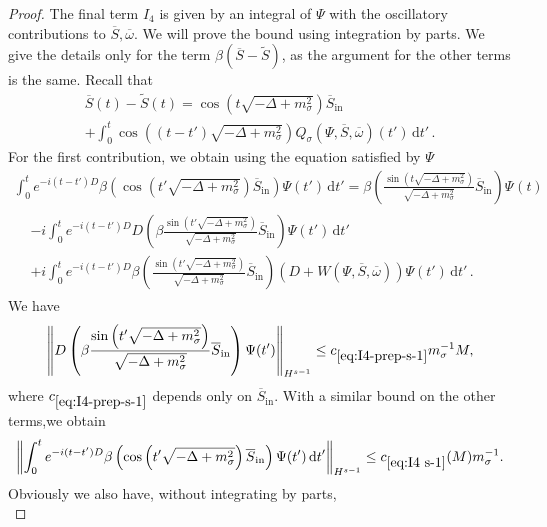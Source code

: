 \documentclass[10pt]{amsart}
\theoremstyle{definition}\newtheorem{defi}[theo]{Definition}\newtheorem{rema}[theo]{Remark}\newtheorem{exam}[theo]{Example}\newtheorem{exem}[theo]{Example}\newtheorem{nota}[theo]{Notation}
\newcommand{\rmin}{\mathrm{in}}
\renewcommand\d[1]{{\ensuremath{\,\text{d}#1}}}
\begin{document}
\begin{proof}
The final term $I_4$ is given by an integral of $\Psi$ with the oscillatory contributions to $\overline{S}, \overline{\omega}$. We will prove the bound using integration by parts. We give the details only for the term $\beta(\overline{S}-\widetilde{S})$, as the argument for the other terms is the same. Recall that
\begin{multline}
\overline{S}(t)-\widetilde{S}(t) =\cos\left(t\sqrt{-\Delta + m^2_\sigma}\right)\overline{S}_\rmin \\
+\int_0^t\cos\left((t-t')\sqrt{-\Delta + m^2_\sigma}\right) Q_\sigma(\Psi,\overline{S}, \overline{\omega})(t')\d t'\,.
\end{multline}
For the first contribution, we obtain using the equation satisfied by $\Psi$
\begin{multline*}
\int_0^t e^{-i(t-t')D}\beta \left(\cos(t'\sqrt{-\Delta + m^2_\sigma})\overline{S}_\rmin\right)\Psi(t') \d t'
=\beta\left(\frac{\sin\left(t\sqrt{-\Delta+m_\sigma^2}
\right)}{\sqrt{-\Delta+m_\sigma^2}}\overline{S}_\rmin\right)\Psi_{}(t)
\\
\begin{aligned}
&-i
\int_0^te^{-i(t-t')D}D\left(
\beta\frac{\sin \left(t'\sqrt{-\Delta+m_\sigma^2}\right)}{\sqrt{-\Delta+m_\sigma^2}}\overline{S}_\rmin\right)
\Psi(t')\d t'\\
&+ i
\int_0^te^{-i(t-t')D}\beta\left(\frac{\sin\left(t'\sqrt{-\Delta+m_\sigma^2}
\right)}{\sqrt{-\Delta+m_\sigma^2}}\overline{S}_\rmin\right)\left(D+W(\Psi, \overline{S}, \overline \omega)\right)\Psi(t')\d t'\,.
\end{aligned}
\end{multline*}
We have
\begin{equation}\label{eq:I4-prep-s-1}
\left\| D\left(
\beta\frac{\sin \left(t'\sqrt{-\Delta+m_\sigma^2}\right)}{\sqrt{-\Delta+m_\sigma^2}}\overline{S}_\rmin\right)
\Psi(t') \right\|_{H^{s-1}} \leq c_{\eqref{eq:I4-prep-s-1}} m_\sigma^{-1} M,
\end{equation}
where $c_{\eqref{eq:I4-prep-s-1}}$ depends only on $\overline{S}_\rmin$. With a similar bound on the other terms,\linebreak we obtain
\begin{equation}\label{eq:I4 s-1}
\left\| \int_0^t e^{-i(t-t')D}\beta \left(\cos\left(t'\sqrt{-\Delta + m^2_\sigma}\right)\overline{S}_\rmin\right)\Psi(t') \d t'\right\|_{H^{s-1}}
\leq c_{\eqref{eq:I4 s-1}}(M) m_\sigma^{-1}.
\end{equation}
Obviously we also have, without integrating by parts,
\begin{equation}\label{eq:I4 s}

\end{equation}
\end{proof}
\end{document}
